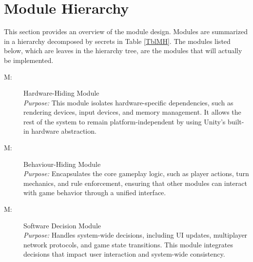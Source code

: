 \documentclass[12pt, titlepage]{article}
\newcounter{mnum}
\newcommand{\mthemnum}{M\themnum}
\begin{document}
\section{Module Hierarchy} \label{SecMH}

This section provides an overview of the module design. Modules are summarized
in a hierarchy decomposed by secrets in Table \ref{TblMH}. The modules listed
below, which are leaves in the hierarchy tree, are the modules that will
actually be implemented.

\begin{description}
\item [ \mthemnum \label{mHH}:] Hardware-Hiding Module \\
  \textit{Purpose:} This module isolates hardware-specific dependencies, such as rendering devices, input devices, and memory management. It allows the rest of the system to remain platform-independent by using Unity's built-in hardware abstraction.
  
\item [ \mthemnum \label{mBH}:] Behaviour-Hiding Module \\
  \textit{Purpose:} Encapsulates the core gameplay logic, such as player actions, turn mechanics, and rule enforcement, ensuring that other modules can interact with game behavior through a unified interface.

\item [ \mthemnum \label{mSD}:] Software Decision Module \\
  \textit{Purpose:} Handles system-wide decisions, including UI updates, multiplayer network protocols, and game state transitions. This module integrates decisions that impact user interaction and system-wide consistency.

\end{description}
\end{document}
